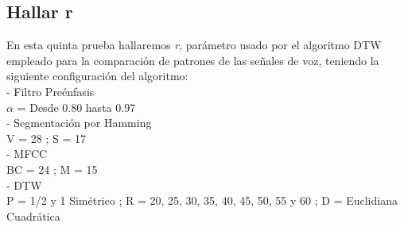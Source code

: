 \subsection{Hallar r}
En esta quinta prueba hallaremos \textit{r}, parámetro usado por el algoritmo DTW empleado para la comparación de patrones de las señales de voz, teniendo la siguiente configuración del algoritmo:\\
- Filtro Preénfasis \\
\hspace*{1cm} $\alpha$ = Desde 0.80 hasta 0.97 \\
- Segmentación por Hamming \\
\hspace*{1cm} V = 28 ; \qquad S = 17 \\
- MFCC \\
\hspace*{1cm} BC = 24 ; \qquad M = 15 \\
- DTW \\
\hspace*{1cm} P = 1/2 y 1 Simétrico ; R = 20, 25, 30, 35, 40, 45, 50, 55 y 60 ; D = Euclidiana Cuadrática
\vskip -1.0cm
